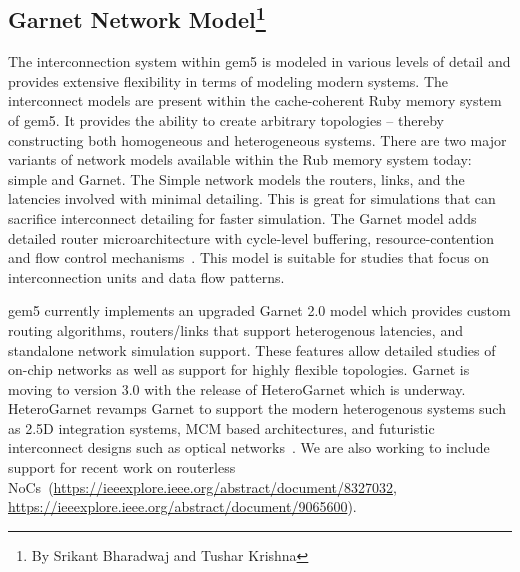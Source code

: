 \subsection[Garnet Network Model]{Garnet Network Model\footnote{By Srikant Bharadwaj and Tushar Krishna}}
\label{sec:garnet}

The interconnection system within gem5 is modeled in various levels of detail and provides extensive
flexibility in terms of modeling modern systems.
The interconnect models are present within the cache-coherent Ruby memory system of gem5.
It provides the ability to create arbitrary topologies – thereby constructing both homogeneous and heterogeneous systems.
There are two major variants of network models available within the Rub memory system today: simple and Garnet.
The Simple network models the routers, links, and the latencies involved with minimal detailing.
This is great for simulations that can sacrifice interconnect detailing for faster simulation.
The Garnet model adds detailed router microarchitecture with cycle-level buffering, resource-contention and flow control mechanisms~\cite{garnet-2}.
This model is suitable for studies that focus on interconnection units and data flow patterns.

gem5 currently implements an upgraded Garnet 2.0 model which provides custom routing algorithms, routers/links that support heterogenous latencies, and standalone network simulation support.
These features allow detailed studies of on-chip networks as well as support for highly flexible topologies.
Garnet is moving to version 3.0 with the release of HeteroGarnet which is underway.
HeteroGarnet revamps Garnet to support the modern heterogenous systems such as 2.5D integration systems, MCM based architectures, and futuristic interconnect designs such as optical networks~\cite{kite}.
We are also working to include support for recent work on routerless NoCs~\cite{}(\url{https://ieeexplore.ieee.org/abstract/document/8327032}, \url{https://ieeexplore.ieee.org/abstract/document/9065600}).

